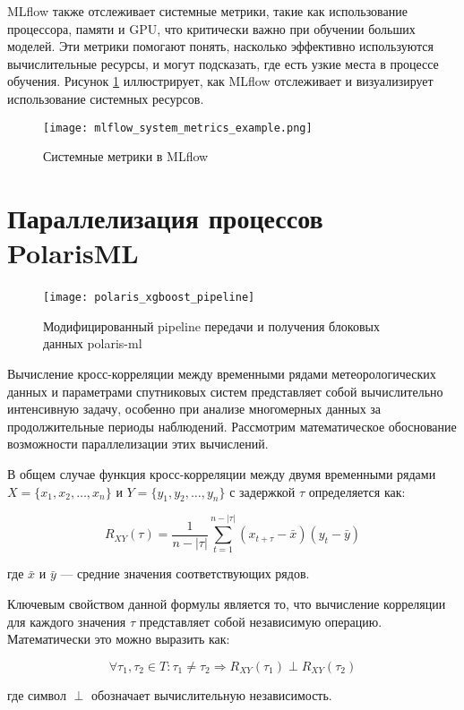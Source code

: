 MLflow также отслеживает системные метрики, такие как использование процессора, памяти и GPU, что критически важно при обучении больших моделей. Эти метрики помогают понять, насколько эффективно используются вычислительные ресурсы, и могут подсказать, где есть узкие места в процессе обучения. Рисунок \ref{fig:mlflow_system_metrics} иллюстрирует, как MLflow отслеживает и визуализирует использование системных ресурсов.

\begin{figure}[H]
	\centering
	\texttt{[image: mlflow\_system\_metrics\_example.png]}
	\caption{Системные метрики в MLflow}
	\label{fig:mlflow_system_metrics}
\end{figure}

\section{Параллелизация процессов PolarisML}

\begin{figure}[!htbp]
	\centering
	\texttt{[image: polaris\_xgboost\_pipeline]}
	~\caption{Модифицированный pipeline передачи и получения блоковых данных polaris-ml}
	\label{fig:polaris_xgboost_pipeline}
\end{figure}

Вычисление кросс-корреляции между временными рядами метеорологических данных и
параметрами спутниковых систем представляет собой вычислительно интенсивную
задачу, особенно при анализе многомерных данных за продолжительные периоды
наблюдений. Рассмотрим математическое обоснование возможности параллелизации
этих вычислений.

В общем случае функция кросс-корреляции между двумя временными рядами $X =
	\{x_1, x_2, \ldots, x_n\}$ и $Y = \{y_1, y_2, \ldots, y_n\}$ с задержкой $\tau$
определяется как:

\[
	R_{XY}(\tau) = \frac{1}{n-|\tau|} \sum_{t=1}^{n-|\tau|} (x_{t+\tau} - \bar{x})(y_t - \bar{y})
\]

где $\bar{x}$ и $\bar{y}$ — средние значения соответствующих рядов.

Ключевым свойством данной формулы является то, что вычисление корреляции для
каждого значения $\tau$ представляет собой независимую операцию. Математически
это можно выразить как:

\[
	\forall \tau_1, \tau_2 \in T: \tau_1 \neq \tau_2 \Rightarrow R_{XY}(\tau_1) \perp R_{XY}(\tau_2)
\]

где символ $\perp$ обозначает вычислительную независимость.

